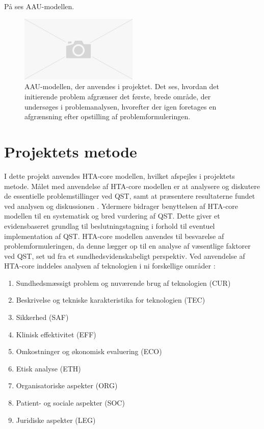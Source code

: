 På  ses AAU-modellen. 

\begin{figure}[H] 
	\begin{center}
		\includegraphics[width=0.5\textwidth]{figures/cMetode/AAUmodel}
	\end{center}
	\caption{AAU-modellen, der anvendes i projektet. Det ses, hvordan det initierende problem afgrænser det første, brede område, der undersøges i problemanalysen, hvorefter der igen foretages en afgrænsning efter opstilling af problemformuleringen.} 
	\label{fig:AAUmodel} 
\end{figure}


\section{Projektets metode}
I dette projekt anvendes HTA-core modellen, hvilket afspejles i projektets metode. Målet med anvendelse af HTA-core modellen er at analysere og diskutere de essentielle problemstillinger ved QST, samt at præsentere resultaterne fundet ved analysen og diskussionen \citep{HTAcore}. Ydermere bidrager benyttelsen af HTA-core modellen til en systematisk og bred vurdering af QST. Dette giver et evidensbaseret grundlag til beslutningstagning i forhold til eventuel implementation af QST. \citep{metodehaandbogen} \citep{HTAcore} HTA-core modellen anvendes til besvarelse af problemformuleringen, da denne lægger op til en analyse af væsentlige faktorer ved QST, set ud fra et sundhedsvidenskabeligt perspektiv. Ved anvendelse af HTA-core inddeles analysen af teknologien i ni forskellige områder \citep{HTAcore}:

\begin{enumerate}
\item Sundhedsmæssigt problem og nuværende brug af teknologien (CUR)
\item Beskrivelse og tekniske karakteristika for teknologien (TEC)
\item Sikkerhed (SAF)
\item Klinisk effektivitet (EFF)
\item Omkostninger og økonomisk evaluering (ECO)
\item Etisk analyse (ETH)
\item Organisatoriske aspekter (ORG)
\item Patient- og sociale aspekter (SOC)
\item Juridiske aspekter (LEG)
\end{enumerate}

